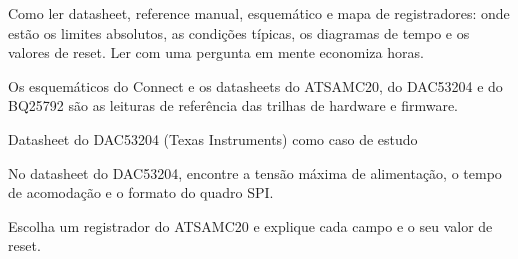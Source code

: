 Como ler datasheet, reference manual, esquemático e mapa de registradores: onde estão os limites absolutos, as condições típicas, os diagramas de tempo e os valores de reset. Ler com uma pergunta em mente economiza horas.

\begin{noproduto}
Os esquemáticos do Connect e os datasheets do ATSAMC20, do DAC53204 e do BQ25792 são as leituras de referência das trilhas de hardware e firmware.
\end{noproduto}

\begin{paraestudar}
  \item {}
  \item Datasheet do DAC53204 (Texas Instruments) como caso de estudo
\end{paraestudar}

\begin{pratique}
  \item No datasheet do DAC53204, encontre a tensão máxima de alimentação, o tempo de acomodação e o formato do quadro SPI.
  \item Escolha um registrador do ATSAMC20 e explique cada campo e o seu valor de reset.
\end{pratique}
